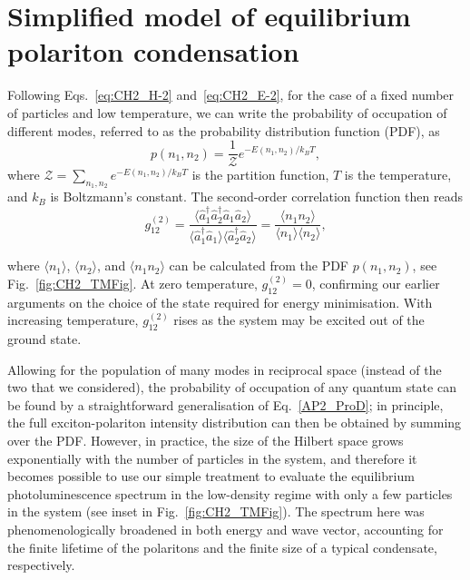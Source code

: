 
\section{Simplified model of equilibrium polariton condensation}\label{AP:A2}

Following Eqs.~\eqref{eq:CH2_H-2} and~\eqref{eq:CH2_E-2}, for the case of a fixed number of particles and low temperature, we can write the probability of occupation of different modes, referred to as the probability distribution function (PDF), as
%
\begin{equation}
	p\left( n_1, n_2 \right)=\frac{1}{\mathcal{Z}}e^{-E\left( n_1,n_2 \right)/k_B T},
	\label{AP2_ProD}
\end{equation}
%
where $\mathcal{Z}=\sum_{n_1,n_2}e^{-E\left( n_1,n_2 \right)/k_B T}$ is the partition function, $T$ is the temperature, and $k_B$ is Boltzmann's constant. The second-order correlation function then reads
%
\begin{equation}
	g_{12}^{(2)} =\frac{\langle \hat{a}_1^\dag \hat{a}_2^\dag \hat{a}_1 \hat{a}_2 \rangle}{\langle \hat{a}_1^\dag \hat{a}_1 \rangle \langle \hat{a}_2^\dag \hat{a}_2 \rangle} = \frac{\langle n_1 n_2 \rangle}{\langle n_1 \rangle \langle n_2 \rangle},
	\label{AP2_G_2}
\end{equation}

where $\langle n_1\rangle$, $\langle n_2\rangle$, and $\langle n_1n_2\rangle$ can be calculated from the PDF $p(n_1,n_2)$, see Fig.~\ref{fig:CH2_TMFig}. 
At zero temperature, $g_{12}^{(2)}=0$, confirming our earlier arguments on the choice of the state required for energy minimisation. 
With increasing temperature, $g_{12}^{(2)}$ rises as the system may be excited out of the ground state.

Allowing for the population of many modes in reciprocal space (instead of the two that we considered), the probability of occupation of any quantum state can be found by a straightforward generalisation of Eq.~\eqref{AP2_ProD}; 
in principle, the full exciton-polariton intensity distribution can then be obtained by summing over the PDF. However, in practice, the size of the Hilbert space grows exponentially with the number of particles in the system, and therefore it becomes possible to use our simple treatment to evaluate the equilibrium photoluminescence spectrum in the low-density regime with only a few particles in the system (see inset in Fig.~\ref{fig:CH2_TMFig}). 
The spectrum here was phenomenologically broadened in both energy and wave vector, accounting for the finite lifetime of the polaritons and the finite size of a typical condensate, respectively.

